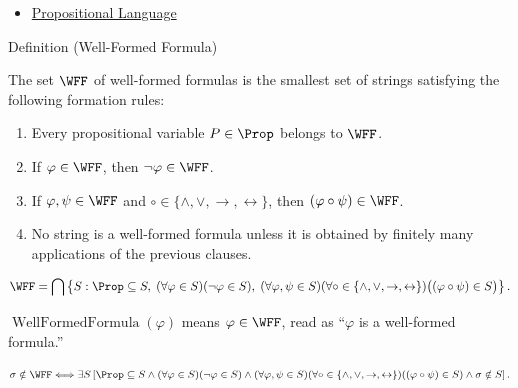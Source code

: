 \begin{dependencies}
\begin{itemize}
  \item \hyperref[def:propositional-language]{Propositional Language}
\end{itemize}
\end{dependencies}
\begin{definitionbox}{Definition (Well-Formed Formula)}
\begin{definition}
\label{def:well-formed-formula}
The set \(\WFF\) of well-formed formulas is the smallest set of strings satisfying the following formation rules:
\begin{enumerate}
\item Every propositional variable \(P\in\Prop\) belongs to \(\WFF\).
\item If \(\varphi\in\WFF\), then \(\neg\varphi\in\WFF\).
\item If \(\varphi,\psi\in\WFF\) and \(\circ\in\{\land,\lor,\to,\leftrightarrow\}\), then \((\varphi\circ\psi)\in\WFF\).
\item No string is a well-formed formula unless it is obtained by finitely many applications of the previous clauses.
\end{enumerate}
\end{definition}
\end{definitionbox}

\begin{remark*}
\[
\WFF
=
\bigcap
\left\{
S :
\Prop\subseteq S,\;
(\forall\varphi\in S)(\neg\varphi\in S),\;
(\forall\varphi,\psi\in S)
(\forall\circ\in\{\land,\lor,\to,\leftrightarrow\})
\bigl((\varphi\circ\psi)\in S\bigr)
\right\}.
\]
\end{remark*}

\begin{remark*}
\(\operatorname{WellFormedFormula}(\varphi)\) means \(\varphi\in\WFF\), read as ``\(\varphi\) is a well-formed formula.''
\end{remark*}

\begin{remark*}
\[
\sigma\notin\WFF
\Longleftrightarrow
\exists S
\left[
\Prop\subseteq S
\land
(\forall\varphi\in S)(\neg\varphi\in S)
\land
(\forall\varphi,\psi\in S)
(\forall\circ\in\{\land,\lor,\to,\leftrightarrow\})
((\varphi\circ\psi)\in S)
\land
\sigma\notin S
\right].
\]
\end{remark*}

